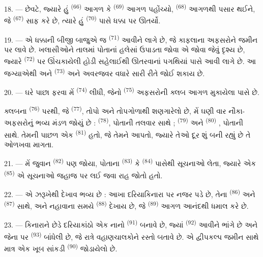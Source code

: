 18. --- છેવટે, જ્યારે હું  \textsuperscript{(66)} આગળ
કે  \textsuperscript{(69)} આગળ પહોંચ્યો,
 \textsuperscript{(68)} આગળથી પસાર થઈને, જે
 \textsuperscript{(67)} સાફ કરે છે, ત્યારે હું
 \textsuperscript{(70)} પાસે ધક્કા પર ઊતર્યો.

19. --- એ ધક્કાની બીજી બાજુએ જ  \textsuperscript{(71)}
આવીને લાગે છે, જે કાફલાના અફસરોને જમીન પર લાવે છે. ખલાસીઓને તાલમાં
પોતાનાં હલેસાં ઉપાડતા જોવા એ જોવા જેવું દૃશ્ય છે, જ્યારે 
\textsuperscript{(72)} પર ઊંચકાયેલી હોડી સહેલાઈથી ઊતરવાનાં પગથિયાં પાસે
આવી લાગે છે. આ જગ્યાએથી  અને 
\textsuperscript{(73)}  અને  અવરજવર વધારે
સારી રીતે જોઈ શકાય છે.

\VUsaut{3.0mm}
\VUsaut{3.0mm}

20. --- ઘરે પાછા ફરવા મેં  \textsuperscript{(74)}
લીધી, જેનો  \textsuperscript{(75)} અફસરોની ક્લબ આગળ મુકાયેલા
 પાસે છે.

ક્લબના  \textsuperscript{(76)} પરથી, જે 
\textsuperscript{(77)}, તોપો અને તોપગોળાથી શણગારેલો છે, મેં ઘણી વાર
નૌકા-અફસરોનું ભવ્ય મંડળ જોયું છે : 
\textsuperscript{(78)}, પોતાની તલવાર સાથે ; 
\textsuperscript{(79)} અને  \textsuperscript{(80)}
, પોતાની  સાથે. તેમની પાછળ એક
 \textsuperscript{(81)} હતો, જે તેમને 
આપતો, જ્યારે તેઓ દૂર શું બની રહ્યું છે તે ઓળખવા માગતા.

21. --- મેં જુવાન  \textsuperscript{(82)} પણ
જોયા, પોતાના  \textsuperscript{(83)} કે
 \textsuperscript{(84)} પાસેથી સૂચનાઓ લેતા, જ્યારે એક
 \textsuperscript{(85)} એ સૂચનાઓ જહાજ પર લઈ જવા
રાહ જોતો હતો.

22. --- એ ઝરૂખેથી દેખાવ ભવ્ય છે : આખા દરિયાકિનારા પર નજર પડે છે, તેના
 \textsuperscript{(86)} અને 
\textsuperscript{(87)} સાથે, અને નહાવાના સમયે 
\textsuperscript{(88)} દેખાય છે, જે 
\textsuperscript{(89)} આગળ આનંદથી ધમાલ કરે છે.

23. --- કિનારાને છેડે દરિયાકાંઠો એક નાનો 
\textsuperscript{(91)}  બનાવે છે, જ્યાં  \textsuperscript{(92)} આવીને ભાંગે છે અને જેના પર
 \textsuperscript{(93)} બાંધેલી છે, જે રાત્રે
વહાણચાલકોને રસ્તો બતાવે છે. એ દ્વીપકલ્પ જમીન સાથે માત્ર એક ખૂબ સાંકડી
 \textsuperscript{(90)} જોડાયેલો છે.

